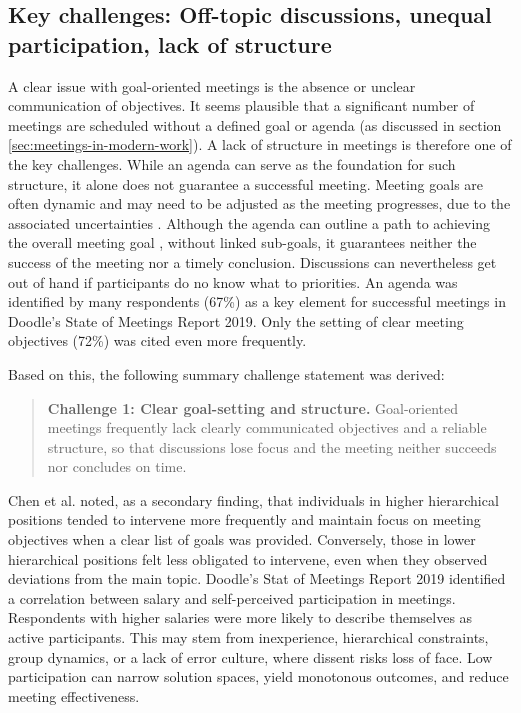 \subsection{Key challenges: Off-topic discussions, unequal participation, lack of structure}
\label{sec:key-challenges-in-meetings}
A clear issue with goal-oriented meetings is the absence or unclear communication of objectives. It seems
plausible that a significant number of meetings are scheduled without a defined goal or agenda (as discussed in section
\ref{sec:meetings-in-modern-work}).
A lack of structure in meetings is therefore one of the key challenges.
While an agenda can serve as the foundation for such structure, it alone does not guarantee a successful
meeting. Meeting goals are often dynamic and may need to be adjusted as the meeting progresses, due to the associated
uncertainties \cite[chap 4.1]{chenAreWeTrack2025}. Although the agenda can outline a path to achieving the
overall meeting goal \cite[chap 2.1]{scottMentalModelsMeeting2024}, without linked sub-goals, it guarantees
neither the success of the meeting nor a timely conclusion. \cite[chap 4.1]{chenAreWeTrack2025}
Discussions can nevertheless get out of hand if participants do no know what to priorities.
\cite[chap 4.1]{chenAreWeTrack2025}
An agenda was identified by many respondents (67\%) as a key element for successful meetings in Doodle’s State
of Meetings Report 2019. Only the setting of clear meeting objectives (72\%) was cited even more frequently.
\cite[p. 11]{DoodleStateMeetings2019}

Based on this, the following summary challenge statement was derived:

\begin{quote}
  \textbf{Challenge 1: Clear goal-setting and structure.}
  \label{chal:clear-goals-and-structure}
  Goal-oriented meetings frequently lack clearly communicated objectives and a reliable structure, so that
  discussions lose focus and the meeting neither succeeds nor concludes on time.
\end{quote}

Chen et al. noted, as a secondary finding, that individuals in higher hierarchical positions tended to
intervene more frequently and maintain focus on meeting objectives when a clear list of goals was provided.
Conversely, those in lower hierarchical positions felt less obligated to intervene, even when they observed
deviations from the main topic. \cite{chenAreWeTrack2025}
Doodle’s Stat of Meetings Report 2019 identified a correlation between salary and self-perceived
participation in meetings. Respondents with higher salaries were more likely to describe themselves as active
participants. \cite[p. 6]{DoodleStateMeetings2019}
This may stem from inexperience, hierarchical constraints, group dynamics, or a lack of error culture, where
dissent risks loss of face. Low participation can narrow solution spaces, yield monotonous outcomes, and
reduce meeting effectiveness.

